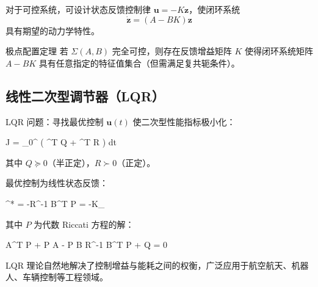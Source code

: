 对于可控系统，可设计状态反馈控制律 $\mathbf{u} = -K \mathbf{z}$，使闭环系统
\[
\dot{\mathbf{z}} = (A - BK) \mathbf{z}
\]
具有期望的动力学特性。

\begin{theorem}{极点配置定理}
	若 $\Sigma(A,B)$ 完全可控，则存在反馈增益矩阵 $K$ 使得闭环系统矩阵 $A - BK$ 具有任意指定的特征值集合（但需满足复共轭条件）。
\end{theorem}

\subsection{线性二次型调节器（LQR）}

LQR 问题：寻找最优控制 $\mathbf{u}(t)$ 使二次型性能指标极小化：
\begin{myformula}
	J = \int_{0}^{\infty} \left( ^T Q  + ^T R  \right) dt
\end{myformula}
其中 $Q \succeq 0$（半正定），$R \succ 0$（正定）。

最优控制为线性状态反馈：
\begin{myformula}
	^* = -R^{-1} B^T P  = -K_{} 
\end{myformula}
其中 $P$ 为代数 Riccati 方程的解：
\begin{myformula}
	A^T P + P A - P B R^{-1} B^T P + Q = 0
\end{myformula}

\begin{remark}
	LQR 理论自然地解决了控制增益与能耗之间的权衡，广泛应用于航空航天、机器人、车辆控制等工程领域。
\end{remark}
